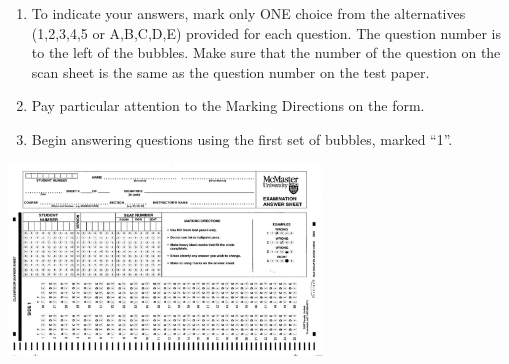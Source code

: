 {\begin{enumerate}
\item To indicate your answers, mark only ONE choice from the alternatives (1,2,3,4,5 or A,B,C,D,E) provided for each question.  The question number is to the left of the bubbles.  Make sure that the number of the question on the scan sheet is the same as the question number on the test paper.

\item Pay particular attention to the Marking Directions on the form.

\item Begin answering questions using the first set of bubbles, marked ``1''.

\end{enumerate}

\includegraphics[height=2in]{scantron.jpg}

}
\clearpage
